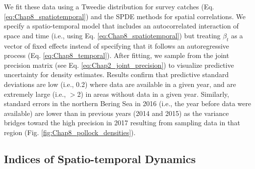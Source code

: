 We fit these data using a Tweedie distribution for survey catches (Eq. \ref{eq:Chap8_spatiotemporal}) and the SPDE methods for spatial correlations. We specify a spatio-temporal model that includes an autocorrelated interaction of space and time (i.e., using Eq. \ref{eq:Chap8_spatiotemporal}) but treating \( \beta_t \) as a vector of fixed effects instead of specifying that it follows an autoregressive process (Eq. \ref{eq:Chap8_temporal}). After fitting, we sample from the joint precision matrix (see Eq. \ref{eq:Chap2_joint_precision}) to visualize predictive uncertainty for density estimates.  Results confirm that predictive standard deviations are low (i.e., 0.2) where data are available in a given year, and are extremely large (i.e., $>$2) in areas without data in a given year.  Similarly, standard errors in the northern Bering Sea in 2016 (i.e., the year before data were available) are lower than in previous years (2014 and 2015) as the variance bridges toward the high precision in 2017 resulting from sampling data in that region (Fig. \ref{fig:Chap8_pollock_densities}).  

\subsection{Indices of Spatio-temporal Dynamics}

